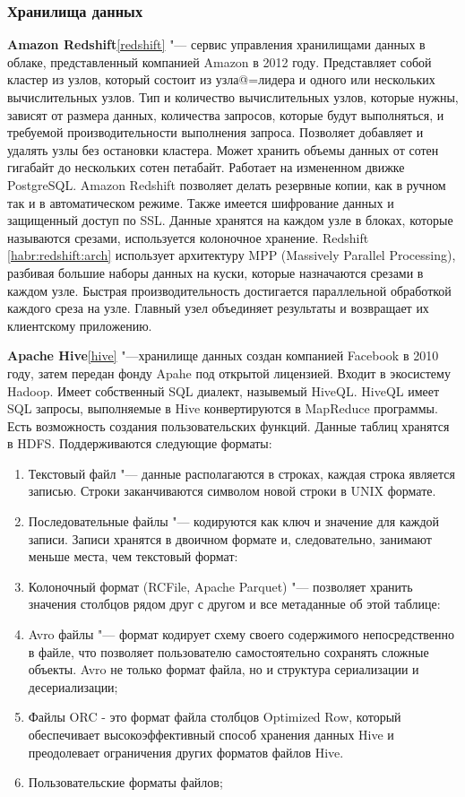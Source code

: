 \documentclass[bachelor, och, pract]{SCWorks}
\begin{document}
\subsubsection{Хранилища данных}
\textbf{Amazon Redshift}\ref{redshift} "--- сервис управления хранилищами данных в облаке, представленный компанией Amazon в 2012 году. Представляет собой кластер из узлов, который состоит из узла@=лидера и одного или нескольких вычислительных узлов. Тип и количество вычислительных узлов, которые нужны, зависят от размера данных, количества запросов, которые будут выполняться, и требуемой производительности выполнения запроса. Позволяет добавляет и удалять узлы без остановки кластера. Может хранить объемы данных от сотен гигабайт до нескольких сотен петабайт. Работает на измененном движке PostgreSQL. Amazon Redshift позволяет делать резервные копии, как в ручном так и в автоматическом режиме. Также  имеется шифрование данных и защищенный доступ по SSL. Данные хранятся на каждом узле в блоках, которые называются срезами, используется колоночное хранение. Redshift \ref{habr:redshift:arch} использует архитектуру MPP (Massively Parallel Processing), разбивая большие наборы данных на куски, которые назначаются срезами в каждом узле. Быстрая производительность достигается параллельной обработкой каждого среза на узле. Главный узел объединяет результаты и возвращает их клиентскому приложению.

\textbf{Apache Hive}\ref{hive} "---хранилище данных создан компанией Facebook в 2010 году, затем передан фонду Apahe под открытой лицензией. Входит в экосистему Hadoop. Имеет собственный SQL диалект, назывемый HiveQL. HiveQL имеет  SQL запросы, выполняемые в Hive конвертируются в MapReduce  программы. Есть возможность создания пользовательских функций. Данные таблиц хранятся в HDFS. Поддерживаются следующие форматы:
\begin{enumerate}
	\item Текстовый файл "--- данные располагаются в строках, каждая строка является записью. Строки заканчиваются символом новой строки в  UNIX формате.
	\item  Последовательные файлы "---  кодируются как ключ и значение для каждой записи. Записи хранятся в двоичном формате и, следовательно, занимают меньше места, чем текстовый формат:
	\item Колоночный формат (RCFile,  Apache Parquet) "--- позволяет хранить значения столбцов рядом друг с другом и все метаданные об этой таблице:
	\item Avro файлы "--- формат кодирует схему своего содержимого непосредственно в файле, что позволяет пользователю самостоятельно сохранять сложные объекты. Avro не только  формат файла, но и структура сериализации и десериализации;
	\item Файлы ORC - это формат файла столбцов Optimized Row, который обеспечивает высокоэффективный способ хранения данных Hive и преодолевает ограничения других форматов файлов Hive.
	\item  Пользовательские форматы файлов;
\end{enumerate}
\end{document}
